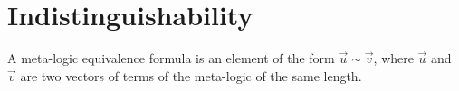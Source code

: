 \section{Indistinguishability}

\newcommand{\pair}[1]{\langle #1 \rangle}



\newcommand{\fold}{\mathsf{fold}}




\begin{definition}
  A meta-logic equivalence formula is an element of the form $\vec{u} \sim \vec{v}$, where $\vec{u}$ and $\vec{v}$ are two vectors of terms of the meta-logic of the same length.
\end{definition}


